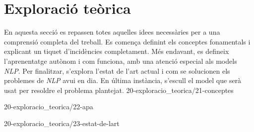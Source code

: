 \chapter{Exploració teòrica}
En aquesta secció es repassen totes aquelles idees necessàries per a una comprensió completa del treball. Es comença definint els conceptes fonamentals i explicant un tiquet d'incidències completament. Més endavant, es defineix l'aprenentatge autònom i com funciona, amb una atenció especial als models \textit{NLP}. Per finalitzar, s'explora l'estat de l'art actual i com se solucionen els problemes de \textit{NLP} avui en dia. En última instància, s'escull el model que serà usat per resoldre el problema plantejat.
{20-exploracio_teorica/21-conceptes}

{20-exploracio_teorica/22-apa}

{20-exploracio_teorica/23-estat-de-lart}
